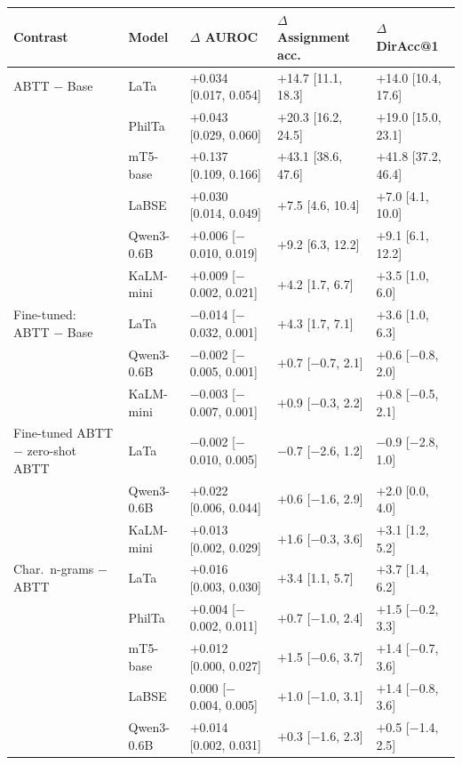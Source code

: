 \begin{table}[t]
\centering
\scriptsize
\setlength{\tabcolsep}{3pt}
\begin{tabular}{lllll}
\toprule
\textbf{Contrast} & \textbf{Model} & $\Delta$ AUROC & $\Delta$ Assignment acc. & $\Delta$ DirAcc@1 \\
\midrule
ABTT $-$ Base & LaTa & $+$0.034 [0.017, 0.054] & $+$14.7 [11.1, 18.3] & $+$14.0 [10.4, 17.6] \\
 & PhilTa & $+$0.043 [0.029, 0.060] & $+$20.3 [16.2, 24.5] & $+$19.0 [15.0, 23.1] \\
 & mT5-base & $+$0.137 [0.109, 0.166] & $+$43.1 [38.6, 47.6] & $+$41.8 [37.2, 46.4] \\
 & LaBSE & $+$0.030 [0.014, 0.049] & $+$7.5 [4.6, 10.4] & $+$7.0 [4.1, 10.0] \\
 & Qwen3-0.6B & $+$0.006 [$-$0.010, 0.019] & $+$9.2 [6.3, 12.2] & $+$9.1 [6.1, 12.2] \\
 & KaLM-mini & $+$0.009 [$-$0.002, 0.021] & $+$4.2 [1.7, 6.7] & $+$3.5 [1.0, 6.0] \\
\midrule
Fine-tuned: ABTT $-$ Base & LaTa & $-$0.014 [$-$0.032, 0.001] & $+$4.3 [1.7, 7.1] & $+$3.6 [1.0, 6.3] \\
 & Qwen3-0.6B & $-$0.002 [$-$0.005, 0.001] & $+$0.7 [$-$0.7, 2.1] & $+$0.6 [$-$0.8, 2.0] \\
 & KaLM-mini & $-$0.003 [$-$0.007, 0.001] & $+$0.9 [$-$0.3, 2.2] & $+$0.8 [$-$0.5, 2.1] \\
\midrule
Fine-tuned ABTT $-$ zero-shot ABTT & LaTa & $-$0.002 [$-$0.010, 0.005] & $-$0.7 [$-$2.6, 1.2] & $-$0.9 [$-$2.8, 1.0] \\
 & Qwen3-0.6B & $+$0.022 [0.006, 0.044] & $+$0.6 [$-$1.6, 2.9] & $+$2.0 [0.0, 4.0] \\
 & KaLM-mini & $+$0.013 [0.002, 0.029] & $+$1.6 [$-$0.3, 3.6] & $+$3.1 [1.2, 5.2] \\
\midrule
Char.\ n-grams $-$ ABTT & LaTa & $+$0.016 [0.003, 0.030] & $+$3.4 [1.1, 5.7] & $+$3.7 [1.4, 6.2] \\
 & PhilTa & $+$0.004 [$-$0.002, 0.011] & $+$0.7 [$-$1.0, 2.4] & $+$1.5 [$-$0.2, 3.3] \\
 & mT5-base & $+$0.012 [0.000, 0.027] & $+$1.5 [$-$0.6, 3.7] & $+$1.4 [$-$0.7, 3.6] \\
 & LaBSE & 0.000 [$-$0.004, 0.005] & $+$1.0 [$-$1.0, 3.1] & $+$1.4 [$-$0.8, 3.6] \\
 & Qwen3-0.6B & $+$0.014 [0.002, 0.031] & $+$0.3 [$-$1.6, 2.3] & $+$0.5 [$-$1.4, 2.5] \\

\end{tabular}
\end{table}
